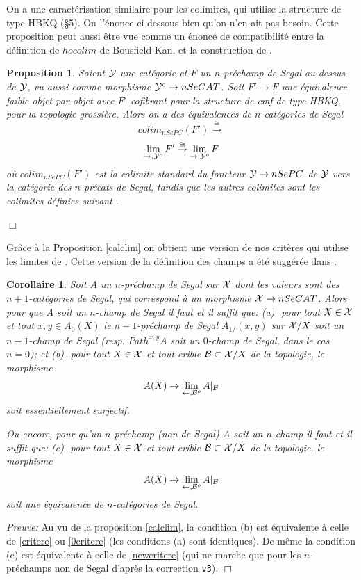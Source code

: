 \documentclass[12pt]{article}
\newcommand{\eop}{\hfill $\Box$\vspace{.1in}}
\newtheorem{proposition}[lemma]{Proposition}
\newtheorem{corollaire}[lemma]{Corollaire}
\newcommand{\Bb}{{\cal B}}
\newcommand{\Xx}{{\cal X}}
\newcommand{\Yy}{{\cal Y}}
\begin{document}
On a une caract\'erisation similaire pour les colimites, qui utilise la
structure de type HBKQ (\S 5). On l'\'enonce ci-dessous
bien qu'on n'en ait pas besoin. Cette proposition
peut aussi \^etre vue comme un \'enonc\'e de compatibilit\'e entre la
d\'efinition de
$hocolim$ de Bousfield-Kan,
et la construction de \cite{limits}.

\begin{proposition}
\label{calccolim}
Soient $\Yy$ une cat\'egorie et $F$ un $n$-pr\'echamp de Segal
au-dessus de $\Yy$, vu aussi comme morphisme
$\Yy ^o\rightarrow nSeCAT$. Soit $F'\rightarrow F$ une \'equivalence faible
objet-par-objet avec $F'$ cofibrant pour la
structure de cmf de type HBKQ, pour la topologie
grossi\`ere. Alors on a des \'equivalences de $n$-cat\'egories de Segal
$$
colim_{nSePC}(F')
\stackrel{\cong}{\rightarrow}
$$
$$
\lim _{\rightarrow , \Yy ^o} F' \stackrel{\cong}{\rightarrow}
\lim _{\rightarrow , \Yy ^o} F
$$
o\`u $colim_{nSePC}(F')$ est la colimite standard du foncteur $\Yy \rightarrow
nSePC$ de $\Yy$ vers la cat\'egorie des $n$-pr\'ecats de Segal,
tandis que les autres
colimites
sont les colimites d\'efinies suivant \cite{limits}.
\end{proposition}
\eop

Gr\^ace \`a
la Proposition \ref{calclim} on obtient une version de nos crit\`eres
qui utilise les limites de \cite{limits}. Cette version de la d\'efinition des
champs a \'et\'e sugg\'er\'ee
dans \cite{limits}.

\begin{corollaire}
\label{critereaveclim}
Soit $A$ un $n$-pr\'echamp de Segal sur $\Xx$ dont les valeurs sont
des $n+1$-cat\'egories de Segal, qui correspond \`a un morphisme
$\Xx \rightarrow nSeCAT$.
Alors pour que $A$ soit un $n$-champ de Segal il faut et il suffit que:
\newline
(a)\,\, pour tout $X\in \Xx$ et tout $x,y\in A_0(X)$ le $n-1$-pr\'echamp
de Segal $A_{1/}(x,y)$ sur $\Xx /X$ soit un $n-1$-champ de Segal
(resp. $Path^{x,y}A$ soit un $0$-champ de Segal, dans le cas $n=0$); et
\newline
(b)\,\, pour tout $X\in \Xx$ et tout crible $\Bb \subset \Xx /X$ de la
topologie,
le morphisme
$$
A(X)\rightarrow \lim _{\leftarrow , \Bb ^o} A|_{\Bb}
$$
soit essentiellement surjectif.

Ou encore, pour qu'un $n$-pr\'echamp (non de Segal)
 $A$ soit un $n$-champ il faut et il suffit que:
\newline
(c)\,\, pour tout $X\in \Xx$ et tout crible $\Bb \subset \Xx /X$ de la
topologie,
le morphisme
$$
A(X)\rightarrow \lim _{\leftarrow , \Bb ^o} A|_{\Bb}
$$
soit une \'equivalence de $n$-cat\'egories de Segal.
\end{corollaire}
{\em Preuve:}
Au vu de la proposition \ref{calclim}, la condition (b) est \'equivalente \`a
celle de \ref{critere} ou \ref{0critere} (les conditions (a) sont
identiques). De
m\^eme la condition (c) est \'equivalente \`a celle de \ref{newcritere}
(qui ne marche que pour les $n$-pr\'echamps non de Segal d'apr\`es la correction
{\tt v3}).
\eop
\end{document}
